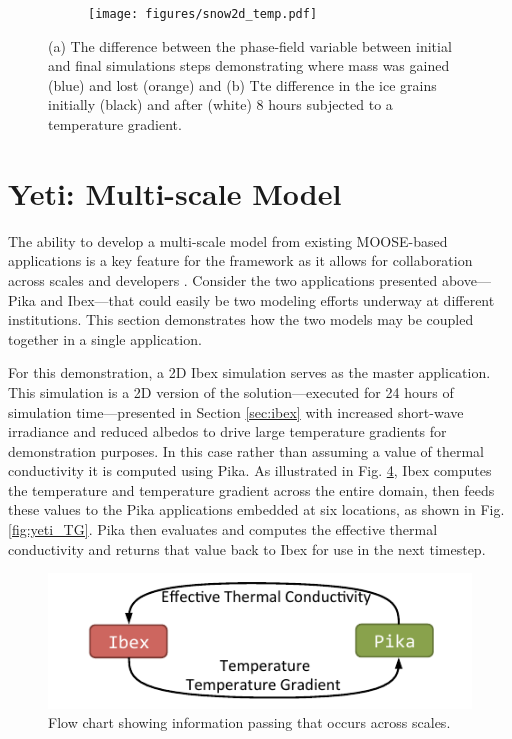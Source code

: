 \begin{figure}
\begin{subfigure}{0.44\linewidth}
  \caption{}
  \label{fig:snow2d:diff}
\end{subfigure}
\hfill
\begin{subfigure}{0.53\linewidth}
  \texttt{[image: figures/snow2d\_temp.pdf]}
  \caption{}
  \label{fig:snow2d:grains}
\end{subfigure}
\caption{(a) The difference between the phase-field variable between initial and final simulations steps demonstrating where mass was gained (blue) and lost (orange) and (b) Tte difference in the ice grains initially (black) and after (white) 8 hours subjected to a  temperature gradient.}
\end{figure}


\section{Yeti: Multi-scale Model}\label{sec:yeti}
The ability to develop a multi-scale model from existing MOOSE-based applications is a key feature for the framework as it allows for collaboration across scales and developers \citep{gaston2014physics}. Consider the two applications presented above---Pika and Ibex---that could easily be two modeling efforts underway at different institutions. This section demonstrates how the two models may be coupled together in a single application.

For this demonstration, a 2D Ibex simulation serves as the master application. This simulation is a 2D version of the solution---executed for 24 hours of simulation time---presented in Section \ref{sec:ibex} with increased short-wave irradiance and reduced albedos to drive large temperature gradients for demonstration purposes. In this case rather than assuming a value of thermal conductivity it is computed using Pika. As illustrated in Fig. \ref{fig:yeti_flow}, Ibex computes the temperature and temperature gradient across the entire domain, then feeds these values to the Pika applications embedded at six locations, as shown in Fig. \ref{fig:yeti_TG}. Pika then evaluates and computes the effective thermal conductivity and returns that value back to Ibex for use in the next timestep.

\begin{figure}[b]
  \includegraphics[width=\linewidth]{figures/flow.pdf}
  \caption{Flow chart showing information passing that occurs across scales.}
  \label{fig:yeti_flow}
\end{figure}

